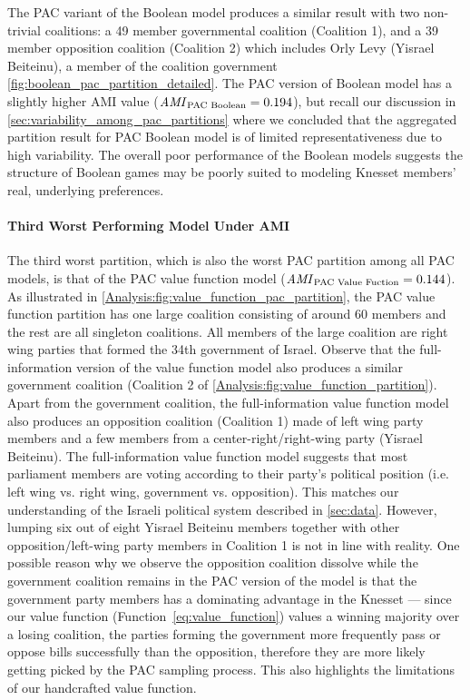 The PAC variant of the Boolean model produces a similar result with two non-trivial
coalitions: a 49 member governmental coalition (Coalition 1), and a 39 member
opposition coalition (Coalition 2) which includes Orly Levy (Yisrael Beiteinu),
a member of the coalition government \autoref{fig:boolean_pac_partition_detailed}.
The PAC version of Boolean model has a slightly higher AMI value
($\mathit{AMI}_{\text{PAC Boolean}} = 0.194$), but recall our discussion in
\autoref{sec:variability_among_pac_partitions} where we concluded that the
aggregated partition result for PAC Boolean model is of limited representativeness
due to high variability.
The overall poor performance of the Boolean models suggests the structure of
Boolean games may be poorly suited to modeling Knesset members' real, underlying
preferences.

\paragraph{Third Worst Performing Model Under AMI}
The third worst partition, which is also the worst PAC partition
among all PAC models, is that of the PAC value function model
($\mathit{AMI}_{\text{PAC Value Fuction}} = 0.144$).
As illustrated in \autoref{Analysis:fig:value_function_pac_partition}, the
PAC value function partition has one large coalition consisting of around 60
members and the rest are all singleton coalitions.
All members of the large coalition are right wing parties that formed the 34th
government of Israel.
Observe that the full-information version of the value function model also
produces a similar government coalition (Coalition 2 of
\autoref{Analysis:fig:value_function_partition}).
Apart from the government coalition, the full-information value function model
also produces an opposition coalition (Coalition 1) made of left wing party
members and a few members from a center-right/right-wing party
(Yisrael Beiteinu).
The full-information value function model suggests that most parliament members
are voting according to their party's political position (i.e. left wing vs.
right wing, government vs. opposition).
This matches our understanding of the Israeli political system described in
\autoref{sec:data}.
However, lumping six out of eight Yisrael Beiteinu members together with other
opposition/left-wing party members in Coalition 1 is not in line with reality.
One possible reason why we observe the opposition coalition dissolve while the
government coalition remains in the PAC version of the model is that the
government party members has a dominating advantage in the Knesset --- since our
value function (Function~\ref{eq:value_function}) values a winning majority over
a losing coalition, the parties forming the government more frequently pass
or oppose bills successfully than the opposition, therefore they are more
likely getting picked by the PAC sampling process.
This also highlights the limitations of our handcrafted value function.

